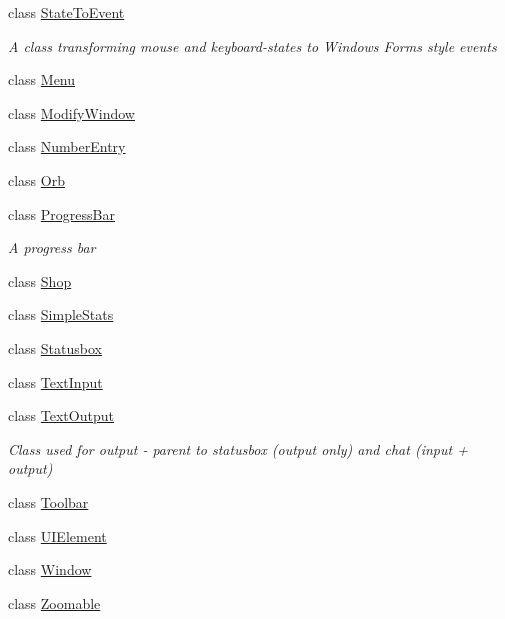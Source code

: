 \begin{DoxyCompactItemize}
class \hyperlink{class_gruppe22_1_1_client_1_1_state_to_event}{State\-To\-Event}
\begin{DoxyCompactList}\small\item\em A class transforming mouse and keyboard-\/states to Windows Forms style events \end{DoxyCompactList}\item 
class \hyperlink{class_gruppe22_1_1_client_1_1_menu}{Menu}
\item 
class \hyperlink{class_gruppe22_1_1_client_1_1_modify_window}{Modify\-Window}
\item 
class \hyperlink{class_gruppe22_1_1_client_1_1_number_entry}{Number\-Entry}
\item 
class \hyperlink{class_gruppe22_1_1_client_1_1_orb}{Orb}
\item 
class \hyperlink{class_gruppe22_1_1_client_1_1_progress_bar}{Progress\-Bar}
\begin{DoxyCompactList}\small\item\em A progress bar \end{DoxyCompactList}\item 
class \hyperlink{class_gruppe22_1_1_client_1_1_shop}{Shop}
\item 
class \hyperlink{class_gruppe22_1_1_client_1_1_simple_stats}{Simple\-Stats}
\item 
class \hyperlink{class_gruppe22_1_1_client_1_1_statusbox}{Statusbox}
\item 
class \hyperlink{class_gruppe22_1_1_client_1_1_text_input}{Text\-Input}
\item 
class \hyperlink{class_gruppe22_1_1_client_1_1_text_output}{Text\-Output}
\begin{DoxyCompactList}\small\item\em Class used for output -\/ parent to statusbox (output only) and chat (input + output) \end{DoxyCompactList}\item 
class \hyperlink{class_gruppe22_1_1_client_1_1_toolbar}{Toolbar}
\item 
class \hyperlink{class_gruppe22_1_1_client_1_1_u_i_element}{U\-I\-Element}
\item 
class \hyperlink{class_gruppe22_1_1_client_1_1_window}{Window}
\item 
class \hyperlink{class_gruppe22_1_1_client_1_1_zoomable}{Zoomable}
\end{DoxyCompactItemize}
